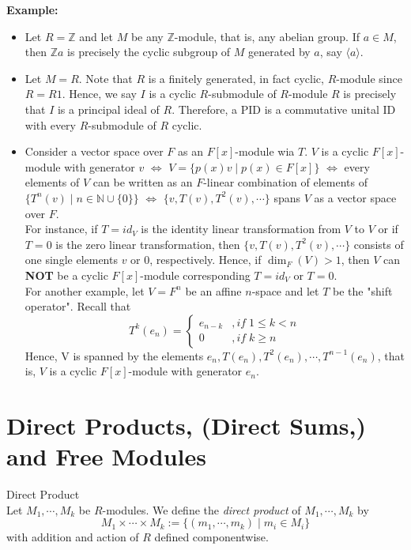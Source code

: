 \noindent\textbf{Example:}\begin{itemize}
    \item Let $R=\mathbb{Z}$ and let $M$ be any $\mathbb{Z}$-module, that is, any abelian group. If $a\in M$, then $\mathbb{Z}a$ is precisely the cyclic subgroup of $M$ generated by $a$, say $\langle a\rangle$.

    \item Let $M=R$. Note that $R$ is a finitely generated, in fact cyclic, $R$-module since $R=R1$. Hence, we say $I$ is a cyclic $R$-submodule of $R$-module $R$ is precisely that $I$ is a principal ideal of $R$. Therefore, a PID is a commutative unital ID with every $R$-submodule of $R$ cyclic.

    \item Consider a vector space over $F$ as an $F[x]$-module wia $T$. $V$ is a cyclic $F[x]$-module with generator $v$ $\Leftrightarrow$ $V= \{p(x) v\mid p(x) \in F[x]\}$ $\Leftrightarrow$ every elements of $V$ can be written as an $F$-linear combination of elements of $\{ T^n(v) \mid n \in \mathbb{N} \cup \{0\} \}$ $\Leftrightarrow$ $\{v ,T(v) ,T^2(v) ,\cdots \}$ spans $V$ as a vector space over $F$.\\
    \noindent For instance, if $T=id_V$ is the identity linear transformation from $V$ to $V$ or if $T=0$ is the zero linear transformation, then $\{v, T(v) ,T^2(v) ,\cdots\}$ consists of one single elements $v$ or $0$, respectively. Hence, if $\dim_F(V) >1$, then $V$ can \textbf{NOT} be a cyclic $F[x]$-module corresponding $T=id_V$ or $T=0$.\\
    For another example, let $V=F^n$ be an affine $n$-space and let $T$ be the "shift operator". Recall that
    $$T^k(e_n) = \begin{cases}
        e_{n-k} &,if\;1 \leq k<n\\
        0 &,if \;k\geq n
    \end{cases}$$
    Hence, V is spanned by the elements $e_n ,T(e_n) ,T^2(e_n) ,\cdots, T^{n-1}(e_n)$, that is, $V$ is a cyclic $F[x ]$-module with generator $e_n$.
\end{itemize}


\section{Direct Products, (Direct Sums,) and Free Modules}

\begin{definition}{Direct Product}\\
Let $M_1 ,\cdots, M_k$ be $R$-modules. We define the \textit{direct product} of $M_1 ,\cdots, M_k$ by
$$M_1 \times \cdots \times M_k := \{(m_1 ,\cdots, m_k) \mid m_i \in M_i \}$$
with addition and action of $R$ defined componentwise.
\end{definition}

